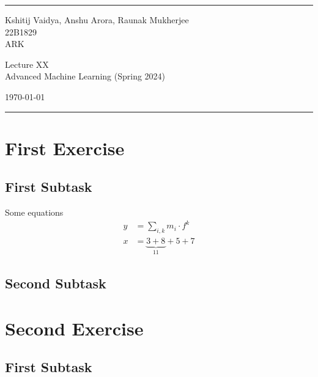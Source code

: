 \documentclass[a4paper]{article}
\begin{document}

\fancyhead[C]{}
\hrule \medskip %
\begin{minipage}{0.295\textwidth} 
\raggedright
\footnotesize
Kshitij Vaidya, Anshu Arora, Raunak Mukherjee \hfill\\   
22B1829\hfill\\
ARK\hfill\\
\end{minipage}
\begin{minipage}{0.4\textwidth} 
\centering 
\large 
Lecture XX\\ 
\normalsize 
Advanced Machine Learning (Spring 2024)\\ 
\end{minipage}
\begin{minipage}{0.295\textwidth} 
\raggedleft
\today\hfill\\
\end{minipage}
\medskip\hrule 
\bigskip


\section{First Exercise}
\blindtext
\subsection{First Subtask}
Some equations
\begin{align*}
y &=  \sum\limits_{i,k} m_i \cdot f^k \\
x &=  
\underset{11}{\underbrace{3 + 8}} + 5 + 7
\end{align*}

\subsection{Second Subtask}
\blindtext

\bigskip


\section{Second Exercise}
\blindtext
\subsection{First Subtask}

\bigskip

\end{document}
